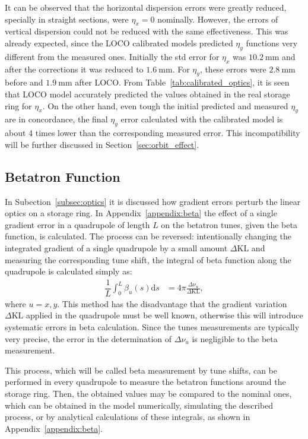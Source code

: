 It can be observed that the horizontal dispersion errors were greatly reduced, specially in straight sections, were $\eta_x = 0$ nominally. However, the errors of vertical dispersion could not be reduced with the same effectiveness. This was already expected, since the LOCO calibrated models predicted $\eta_y$ functions very different from the measured ones. Initially the std error for $\eta_x$ was $\SI{10.2}{\milli\meter}$ and after the corrections it was reduced to $\SI{1.6}{\milli\meter}$. For $\eta_y$, these errors were $\SI{2.8}{\milli\meter}$ before and $\SI{1.9}{\milli\meter}$ after LOCO. From Table~\ref{tab:calibrated_optics}, it is seen that LOCO model accurately predicted the values obtained in the real storage ring for $\eta_x$. On the other hand, even tough the initial predicted and measured  $\eta_y$ are in concordance, the final $\eta_y$ error calculated with the calibrated model is about 4 times lower than the corresponding measured error. This incompatibility will be further discussed in Section~\ref{sec:orbit_effect}.

\subsection{Betatron Function}
In Subection~\ref{subsec:optics} it is discussed how gradient errors perturb the linear optics on a storage ring. In Appendix~\ref{appendix:beta} the effect of a single gradient error in a quadrupole of length $L$ on the betatron tunes, given the beta function, is calculated. The process can be reversed: intentionally changing the integrated gradient of a single quadrupole by a small amount $\Delta \mathrm{KL}$ and measuring the corresponding tune shift, the integral of beta function along the quadrupole is calculated simply as:
\begin{align}
\dfrac{1}{L}\int_{0}^{L} \beta_u(s) \mathrm{d}s &= 4\pi\frac{\Delta \nu_u}{\Delta \mathrm{KL}},
\end{align}
where $u=x, y$. This method has the disadvantage that the gradient variation $\Delta \mathrm{KL}$ applied in the quadrupole must be well known, otherwise this will introduce systematic errors in beta calculation. Since the tunes measurements are typically very precise, the error in the determination of $\Delta \nu_u$ is negligible to the beta measurement.

This process, which will be called beta measurement by tune shifts, can be performed in every quadrupole to measure the betatron functions around the storage ring. Then, the obtained values may be compared to the nominal ones, which can be obtained in the model numerically, simulating the described process, or by analytical calculations of these integrals, as shown in Appendix~\ref{appendix:beta}.

